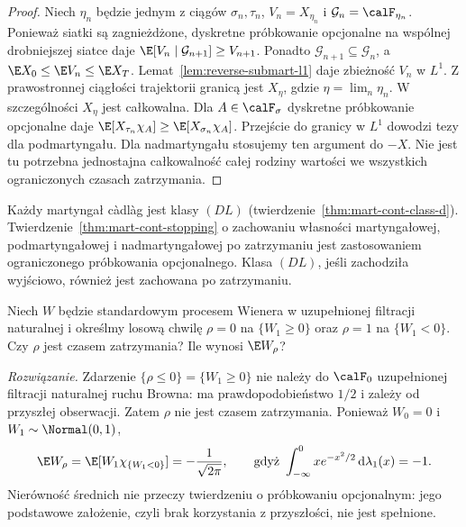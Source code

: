 \begin{proof}
Niech $\eta_n$ będzie jednym z ciągów $\sigma_n,\tau_n$,
$V_n=X_{\eta_n}$ i $\mathcal G_n=\calF_{\eta_n}$.
Ponieważ siatki są zagnieżdżone, dyskretne próbkowanie
opcjonalne na wspólnej drobniejszej siatce daje
$\E[V_n\mid\mathcal G_{n+1}]\ge V_{n+1}$.
Ponadto $\mathcal G_{n+1}\subseteq\mathcal G_n$,
a $\E X_0\le \E V_n\le \E X_T$.
Lemat~\ref{lem:reverse-submart-l1}
daje zbieżność $V_n$ w $L^1$.
Z prawostronnej ciągłości trajektorii granicą
jest $X_\eta$, gdzie $\eta=\lim_n\eta_n$.
W szczególności $X_\eta$ jest całkowalna.
Dla $A\in\calF_\sigma$ dyskretne próbkowanie
opcjonalne daje $\E[X_{\tau_n}\chi_A]\ge
\E[X_{\sigma_n}\chi_A]$.
Przejście do granicy w $L^1$ dowodzi tezy
dla podmartyngału. Dla nadmartyngału stosujemy
ten argument do $-X$. Nie jest tu potrzebna
jednostajna całkowalność całej rodziny wartości
we wszystkich ograniczonych czasach zatrzymania.
\end{proof}

\begin{uwaga}
Każdy martyngał c\`adl\`ag jest klasy $(DL)$
(twierdzenie~\ref{thm:mart-cont-class-d}).
Twierdzenie~\ref{thm:mart-cont-stopping}
o zachowaniu własności martyngałowej,
podmartyngałowej i nadmartyngałowej po zatrzymaniu
jest zastosowaniem ograniczonego próbkowania
opcjonalnego. Klasa $(DL)$, jeśli zachodziła wyjściowo,
również jest zachowana po zatrzymaniu.
\end{uwaga}

\begin{zadanie}
Niech $W$ będzie standardowym procesem Wienera
w uzupełnionej filtracji naturalnej i określmy
losową chwilę $\rho=0$ na $\{W_1\ge0\}$ oraz $\rho=1$
na $\{W_1<0\}$. Czy $\rho$ jest czasem zatrzymania?
Ile wynosi $\E W_\rho$?

\emph{Rozwiązanie.} Zdarzenie $\{\rho\le0\}=\{W_1\ge0\}$
nie należy do $\calF_0$ uzupełnionej filtracji naturalnej
ruchu Browna: ma prawdopodobieństwo $1/2$ i zależy od przyszłej
obserwacji. Zatem $\rho$ nie jest czasem zatrzymania.
Ponieważ $W_0=0$ i $W_1\sim\Normal(0,1)$,
\[
\E W_\rho=\E[W_1\chi_{\{W_1<0\}}]
=-\frac1{\sqrt{2\pi}},
\qquad
\text{gdyż }\int_{-\infty}^0 x e^{-x^2/2}\,
\mathrm d\lambda_1(x)=-1.
\]
Nierówność średnich nie przeczy twierdzeniu o próbkowaniu
opcjonalnym: jego podstawowe założenie, czyli brak
korzystania z przyszłości, nie jest spełnione.
\end{zadanie}


